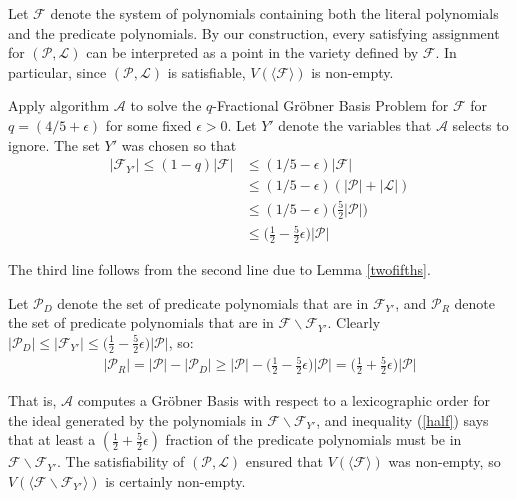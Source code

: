 \documentclass{article}
\begin{document}
Let $\mathcal{F}$ denote the system of polynomials containing both the literal polynomials and the predicate polynomials. By our construction, every satisfying assignment for $(\mathcal{P},\mathcal{L})$ can be interpreted as a point in the variety defined by $\mathcal{F}$. In particular, since $(\mathcal{P},\mathcal{L})$ is satisfiable, $V(\langle \mathcal F \rangle)$ is non-empty.

Apply algorithm $\mathcal{A}$ to solve the $q$-Fractional Gr\"{o}bner Basis Problem for $\mathcal{F}$ for $q=(4/5+\epsilon)$ for some fixed $\epsilon>0$. Let $Y'$ denote the variables that $\mathcal{A}$ selects to ignore. The set $Y'$ was chosen so that
\begin{align*}
|\mathcal{F}_{Y'}|\leq (1-q)|\mathcal{F}|&\leq (1/5-\epsilon)|\mathcal{F}|\\
&\leq (1/5-\epsilon)(|\mathcal{P}|+|\mathcal{L}|)\\
&\leq (1/5-\epsilon)\Big(\frac{5}{2}|\mathcal{P}|\Big)\\
&\leq \Big(\frac{1}{2}-\frac{5}{2}\epsilon\Big)|\mathcal{P}|
\end{align*}

The third line follows from the second line due to Lemma \ref{twofifths}. 

Let $\mathcal{P}_D$ denote the set of predicate polynomials that are in $\mathcal{F}_{Y'}$, and $\mathcal{P}_R$ denote the set of predicate polynomials that are in $\mathcal{F}\backslash\mathcal{F}_{Y'}$. Clearly $|\mathcal{P}_D|\leq |\mathcal{F}_{Y'}|\leq \Big(\frac{1}{2}-\frac{5}{2}\epsilon\Big)|\mathcal{P}|$, so:
\begin{align}\label{half}
|\mathcal{P}_R|= |\mathcal{P}|- |\mathcal{P}_D| \geq |\mathcal{P}|- \Big(\frac{1}{2}-\frac{5}{2}\epsilon\Big)|\mathcal{P}|= \Big(\frac{1}{2}+\frac{5}{2}\epsilon\Big)|\mathcal{P}|
\end{align}

That is, $\mathcal{A}$ computes a Gr\"{o}bner Basis with respect to a lexicographic order for the ideal generated by the polynomials in $\mathcal{F}\backslash \mathcal{F}_{Y'}$, and inequality (\ref{half}) says that at least a $(\frac{1}{2}+\frac{5}{2}\epsilon)$ fraction of the predicate polynomials must be in $\mathcal{F}\backslash \mathcal{F}_{Y'}$. The satisfiability of $(\mathcal{P}, \mathcal{L})$ ensured that $V(\langle \mathcal{F}\rangle)$ was non-empty, so $V(\langle \mathcal{F}\backslash \mathcal{F}_{Y'}\rangle)$ is certainly non-empty.
\end{document}
